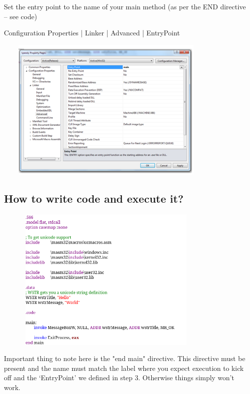 \documentclass[12pt]{extarticle}
\begin{document}
 Set the entry point to the name of your main method (as per the END directive – see code)

Configuration Properties | Linker | Advanced | EntryPoint

\begin{center}

    \includegraphics[width=11cm, height=7cm]{13}
    
 \end{center}

 \subsection{How to write code and execute it?}

 \begin{center}

    \includegraphics[width=11cm, height=7cm]{code}
    
 \end{center}

 Important thing to note here is the "end main" directive. This directive must be present and the name must match the label where you expect execution to kick off and the ‘EntryPoint’ we defined in step 3. Otherwise things simply won’t work.
\end{document}
